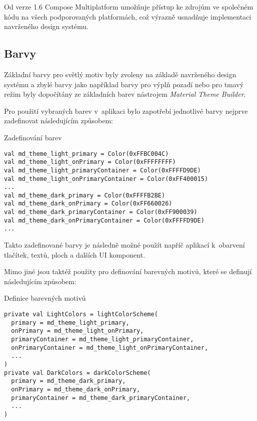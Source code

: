 Od verze 1.6 Compose Multiplatform umožňuje přístup ke zdrojům ve společném kódu na všech podporovaných platformách, což výrazně usnadňuje 
implementaci navrženého design systému. 


\subsection*{Barvy} \label{colorSection}
Základní barvy pro světlý motiv byly zvoleny na základě navrženého design systému
a zbylé barvy jako například barvy pro výplň pozadí nebo pro tmavý režim byly dopočítány ze základních barev nástrojem \textit{Material Theme Builder}.

Pro použití vybraných barev v~aplikaci bylo zapotřebí jednotlivé barvy nejprve zadefinovat následujícím způsobem:

\begin{listing}[H]
\caption{Zadefinování barev}\label{lst:Colors}
\begin{verbatim}
val md_theme_light_primary = Color(0xFFBC004C)
val md_theme_light_onPrimary = Color(0xFFFFFFFF)
val md_theme_light_primaryContainer = Color(0xFFFFD9DE)
val md_theme_light_onPrimaryContainer = Color(0xFF400015)
...
val md_theme_dark_primary = Color(0xFFFFB2BE)
val md_theme_dark_onPrimary = Color(0xFF660026)
val md_theme_dark_primaryContainer = Color(0xFF900039)
val md_theme_dark_onPrimaryContainer = Color(0xFFFFD9DE)
...
\end{verbatim}
\end{listing}

Takto zadefinované barvy je následně možné použít napříč aplikací k~obarvení tlačítek, textů, ploch a dalších UI komponent.

Mimo jiné jsou taktéž použity pro definování barevných motivů, které se definují následujícím způsobem:
\begin{listing}[H]
\caption{Definice barevných motivů}\label{lst:ThemeDef}
\begin{verbatim}
private val LightColors = lightColorScheme(
  primary = md_theme_light_primary,
  onPrimary = md_theme_light_onPrimary,
  primaryContainer = md_theme_light_primaryContainer,
  onPrimaryContainer = md_theme_light_onPrimaryContainer,
  ...
)
private val DarkColors = darkColorScheme(
  primary = md_theme_dark_primary,
  onPrimary = md_theme_dark_onPrimary,
  primaryContainer = md_theme_dark_primaryContainer,
  ...
)
\end{verbatim}
\end{listing}


